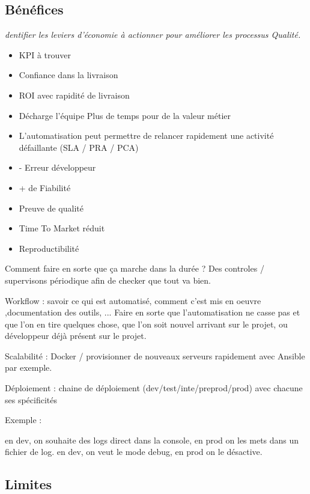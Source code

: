 \subsection{Bénéfices}


\textit{dentifier les leviers d’économie à actionner pour améliorer les processus Qualité.}

\begin{itemize}
	\item KPI à trouver
	\item Confiance dans la livraison
	\item ROI avec rapidité de livraison
	\item Décharge l'équipe
	\subitem Plus de temps pour de la valeur métier
	\item L'automatisation peut permettre de relancer rapidement une activité défaillante (SLA / PRA / PCA)
\end{itemize}

\begin{itemize}
	\item - Erreur développeur
	\item + de Fiabilité
	\item Preuve de qualité
	\item Time To Market réduit
	\item Reproductibilité
\end{itemize}

Comment faire en sorte que ça marche dans la durée ? Des controles / supervisons périodique afin de checker que tout va bien.

Workflow : savoir ce qui est automatisé, comment c'est mis en oeuvre ,documentation des outils, ...
Faire en sorte que l'automatisation ne casse pas et que l'on en tire quelques chose, que l'on soit nouvel arrivant sur le projet, ou développeur déjà présent sur le projet.

Scalabilité : Docker / provisionner de nouveaux serveurs rapidement avec Ansible par exemple.

Déploiement : chaine de déploiement (dev/test/inte/preprod/prod) avec chacune ses spécificités

Exemple :

en dev, on souhaite des logs direct dans la console, en prod on les mets dans un fichier de log.
en dev, on veut le mode debug, en prod on le désactive.

\subsection{Limites}

